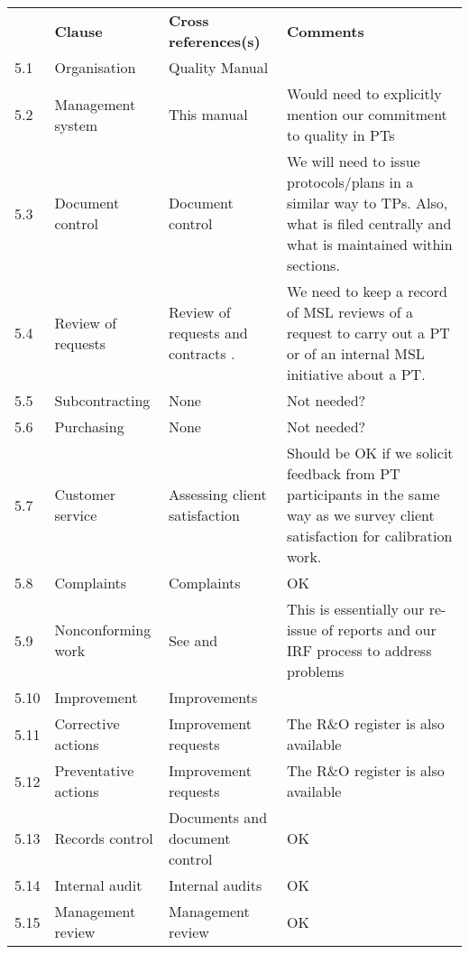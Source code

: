 \begin{center}
{\renewcommand*{\arraystretch}{1.4}
\begin{longtable}{p{1em}p{10em}p{12em}p{16em}}
	\rowcolor[rgb]{ 0,  0,  0} 
	\textcolor[rgb]{ 1,  1,  1}{} & 
	\textcolor[rgb]{ 1,  1,  1}{\textbf{Clause}} & 
	\textcolor[rgb]{ 1,  1,  1}{\textbf{Cross references(s)}} &
	\textcolor[rgb]{ 1,  1,  1}{\textbf{Comments}} \\
5.1	& Organisation	& Quality Manual  \cite[\S\ref*{QM-s:organisation}]{MSL_Quality_Manual}  \\
5.2	&Management system	& This manual	&Would need to explicitly mention our commitment to quality in PTs \\
5.3	& Document control	& Document control\cite[\S\ref*{QM-s:documents_and_document_control}]{MSL_Quality_Manual} & We will need to issue protocols/plans in a similar way to TPs. Also, what is filed centrally and what is maintained within sections.\\
5.4	& Review of requests	& Review of requests and contracts \cite[\S\ref*{QM-s:requests_and_tenders}]{MSL_Quality_Manual} . 
& We need to keep a record of MSL reviews of a request to carry out a PT or of an internal MSL initiative about a PT.\\
5.5	& Subcontracting	& None	& Not needed? \\
5.6	& Purchasing	& None	& Not needed? \\
5.7	& Customer service	& Assessing client satisfaction \cite[\S\ref*{QM-ss:client_satisfaction}]{MSL_Quality_Manual} & Should be OK if we solicit feedback from PT participants in the same way as we survey client satisfaction for calibration work. \\
5.8	& Complaints	& Complaints \cite[\S\ref*{QM-ss:complaints}]{MSL_Quality_Manual} & OK\\

5.9	& Nonconforming work	& See \cite[\S\ref*{QM-ss:metrological_reports}]{MSL_Quality_Manual} and \cite[\S\ref*{QM-ss:improvement_requests}]{MSL_Quality_Manual} &
This is essentially our re-issue of reports and our IRF process to address problems \\
5.10	& Improvement	& Improvements  \cite[\S\ref*{QM-s:improvements}]{MSL_Quality_Manual}  \\
5.11	&Corrective actions	& Improvement requests  \cite[\S\ref*{QM-ss:improvement_requests}]{MSL_Quality_Manual} & The R\&O register is also available \\
5.12	& Preventative actions	& Improvement requests  \cite[\S\ref*{QM-ss:improvement_requests}]{MSL_Quality_Manual} & The R\&O register is also available \\
5.13	& Records control	& Documents and document control \cite[\S\ref*{QM-s:documents_and_document_control}]{MSL_Quality_Manual} & OK\\
5.14	& Internal audit	& Internal audits \cite[\S\ref*{QM-ss:internal_audit}]{MSL_Quality_Manual} & OK \\
5.15	& Management review	& Management review \cite[\S\ref*{QM-ss:management_review}]{MSL_Quality_Manual} & OK \\	
\end{longtable} } 
\end{center}

